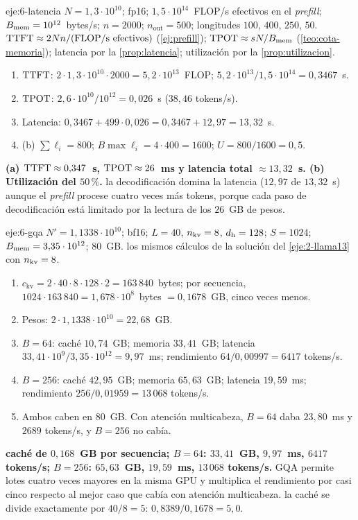 \begin{solucion}{eje:6-latencia}
\datos $N=1{,}3\cdot 10^{10}$; fp16; $1{,}5\cdot 10^{14}$~FLOP/s efectivos en el \emph{prefill}; $B_{\mathrm{mem}}=10^{12}$~bytes/s; $n=2000$; $n_{\mathrm{out}}=500$; longitudes $100$, $400$, $250$, $50$.
\planteamiento $\mathrm{TTFT}\approx 2Nn/(\text{FLOP/s efectivos})$ (\cref{ej:prefill}); $\mathrm{TPOT}\approx sN/B_{\mathrm{mem}}$ (\cref{teo:cota-memoria}); latencia por la \cref{prop:latencia}; utilización por la \cref{prop:utilizacion}.
\pasos
\begin{enumerate}[label=\arabic*.]
  \item $\mathrm{TTFT}$: $2\cdot 1{,}3\cdot 10^{10}\cdot 2000=5{,}2\cdot 10^{13}$~FLOP; $5{,}2\cdot 10^{13}/1{,}5\cdot 10^{14}=0{,}3467$~s.
  \item $\mathrm{TPOT}$: $2{,}6\cdot 10^{10}/10^{12}=0{,}026$~s ($38{,}46$ tokens/s).
  \item Latencia: $0{,}3467+499\cdot 0{,}026=0{,}3467+12{,}97=13{,}32$~s.
  \item (b) $\sum\ell_i=800$; $B\max\ell_i=4\cdot 400=1600$; $U=800/1600=0{,}5$.
\end{enumerate}
\resultado \textbf{(a) $\mathrm{TTFT}\approx 0{,}347$~s, $\mathrm{TPOT}\approx 26$~ms y latencia total $\approx 13{,}32$~s. (b) Utilización del $50\,\%$.}
\comprobacion la decodificación domina la latencia ($12{,}97$ de $13{,}32$~s) aunque el \emph{prefill} procese cuatro veces más tokens, porque cada paso de decodificación está limitado por la lectura de los $26$~GB de pesos.
\end{solucion}

\begin{solucion}{eje:6-gqa}
\datos $N'=1{,}1338\cdot 10^{10}$; bf16; $L=40$, $n_{\mathrm{kv}}=8$, $d_{\mathrm{h}}=128$; $S=1024$; $B_{\mathrm{mem}}=3{,}35\cdot 10^{12}$; 80~GB.
\planteamiento los mismos cálculos de la solución del \cref{eje:2-llama13} con $n_{\mathrm{kv}}=8$.
\pasos
\begin{enumerate}[label=\arabic*.]
  \item $c_{\mathrm{kv}}=2\cdot 40\cdot 8\cdot 128\cdot 2=163\,840$~bytes; por secuencia, $1024\cdot 163\,840=1{,}678\cdot 10^{8}$~bytes $=0{,}1678$~GB, cinco veces menos.
  \item Pesos: $2\cdot 1{,}1338\cdot 10^{10}=22{,}68$~GB.
  \item $B=64$: caché $10{,}74$~GB; memoria $33{,}41$~GB; latencia $33{,}41\cdot 10^{9}/3{,}35\cdot 10^{12}=9{,}97$~ms; rendimiento $64/0{,}00997=6417$ tokens/s.
  \item $B=256$: caché $42{,}95$~GB; memoria $65{,}63$~GB; latencia $19{,}59$~ms; rendimiento $256/0{,}01959=13\,068$ tokens/s.
  \item Ambos caben en 80~GB. Con atención multicabeza, $B=64$ daba $23{,}80$~ms y $2689$ tokens/s, y $B=256$ no cabía.
\end{enumerate}
\resultado \textbf{caché de $0{,}168$~GB por secuencia; $B=64$: $33{,}41$~GB, $9{,}97$~ms, $6417$ tokens/s; $B=256$: $65{,}63$~GB, $19{,}59$~ms, $13\,068$ tokens/s.} GQA permite lotes cuatro veces mayores en la misma GPU y multiplica el rendimiento por casi cinco respecto al mejor caso que cabía con atención multicabeza.
\comprobacion la caché se divide exactamente por $40/8=5$: $0{,}8389/0{,}1678=5{,}0$.
\end{solucion}

